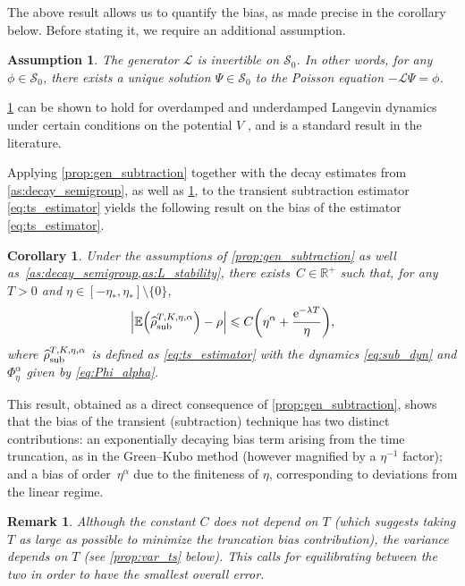 \documentclass[11pt]{article}
\newcommand{\E}{\mathbb{E}}
\newcommand{\R}{\mathbb{R}}
\newcommand{\e}{\mathrm{e}}
\renewcommand{\L}{\mathcal{L}}
\renewcommand{\S}{\mathscr{S}}
\renewcommand{\leq}{\leqslant}
\DeclarePairedDelimiter\paren{\lparen}{\rparen}
\newtheorem{corollary}{Corollary}
\newtheorem{assumption}{Assumption}
\newtheorem{remark}{Remark}
\theoremstyle{definition}
\newcommand{\estTmp}{\widehat{\rho}}
\newcommand{\aTSest}{\estTmp^{T,K,\eta,\alpha}_{\rm sub}} %
\begin{document}
The above result allows us to quantify the bias, as made precise in the corollary below. Before stating it, we require an additional assumption.

\begin{assumption}
\label{as:L_stability}
The generator $\L$ is invertible on $\S_0$. In other words, for any $\phi\in\S_0$, there exists a unique solution $\Psi \in \S_0$ to the Poisson equation $-\L\Psi = \phi$.
\end{assumption}

\cref{as:L_stability} can be shown to hold for overdamped and underdamped Langevin dynamics under certain conditions on the potential $V$ \cite{talay2002,kopec2014,kopec2015}, and is a standard result in the literature.

Applying \cref{prop:gen_subtraction} together with the decay estimates from \cref{as:decay_semigroup}, as well as \cref{as:L_stability}, to the transient subtraction estimator \eqref{eq:ts_estimator} yields the following result on the bias of the estimator \eqref{eq:ts_estimator}.

\begin{corollary}
\label{cor:gk_equiv}
Under the assumptions of \cref{prop:gen_subtraction} as well as~\cref{as:decay_semigroup,as:L_stability}, there exists~$C\in\R^+$ such that, for any $T>0$ and $\eta \in [-\eta_*, \eta_*] \setminus \{0\}$,
\begin{equation}
\notag
	\left|\E\paren*{\aTSest} - \rho\right| \leq C\paren*{\eta^\alpha + \frac{\e^{-\lambda T}}{\eta}},
\end{equation}
where $\aTSest$ is defined as \eqref{eq:ts_estimator} with the dynamics \eqref{eq:sub_dyn} and $\Phi_\eta^\alpha$ given by \eqref{eq:Phi_alpha}.
\end{corollary}

This result, obtained as a direct consequence of \cref{prop:gen_subtraction}, shows that the bias of the transient (subtraction) technique has two distinct contributions: an exponentially decaying bias term arising from the time truncation, as in the Green--Kubo method (however magnified by a $\eta^{-1}$ factor); and a bias of order~$\eta^\alpha$ due to the finiteness of $\eta$, corresponding to deviations from the linear regime.

\begin{remark}
	Although the constant $C$ does not depend on $T$ (which suggests taking $T$ as large as possible to minimize the truncation bias contribution), the variance depends on $T$ (see \cref{prop:var_ts} below). This calls for equilibrating between the two in order to have the smallest overall error.
\end{remark}
\end{document}
